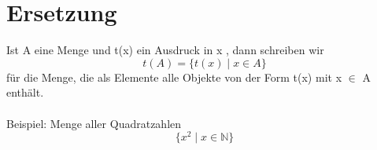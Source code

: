\section{Ersetzung}
Ist A eine Menge und t(x) ein Ausdruck in x , dann schreiben wir
\begin{equation}
    t(A) = \{t(x) \mid x \in A\}
\end{equation}
für die Menge, die als Elemente alle Objekte von der Form t(x) mit
x \(\in\) A enthält.\\\\
Beispiel: Menge aller Quadratzahlen
\begin{equation}
    \{x^2 \mid x \in \mathbb{N}\}
\end{equation}

